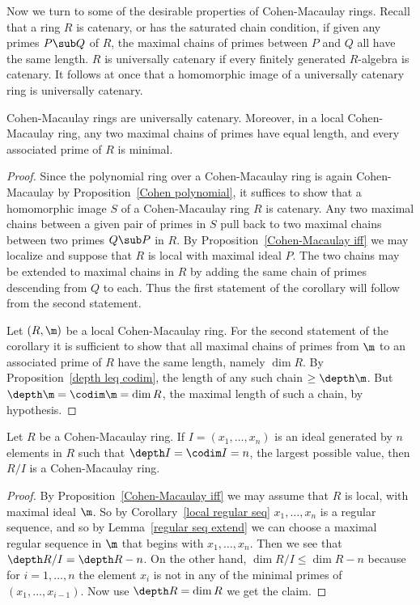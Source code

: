 Now we turn to some of the desirable properties of Cohen-Macaulay rings. Recall that a ring $R$ is catenary, or has the saturated chain condition, if given any primes $P\sub Q$ of $R$, the maximal chains of primes between $P$ and $Q$ all have the same length. $R$ is universally catenary if every finitely generated $R$-algebra is catenary. It follows at once that a homomorphic image of a universally catenary ring is universally catenary.
\begin{corollary}\label{Cohen catenary}
Cohen-Macaulay rings are universally catenary. Moreover, in a local Cohen-Macaulay ring, any two maximal chains of primes have equal length, and every associated prime of $R$ is minimal.
\end{corollary}
\begin{proof}
Since the polynomial ring over a Cohen-Macaulay ring is again Cohen-Macaulay by Proposition~\ref{Cohen polynomial}, it suffices to show that a homomorphic image $S$ of a Cohen-Macaulay ring $R$ is catenary. Any two maximal chains between a given pair of primes in $S$ pull back to two maximal chains between two primes $Q\sub P$ in $R$. By Proposition~\ref{Cohen-Macaulay iff} we may localize and suppose that $R$ is local with maximal ideal $P$. The two chains may be extended to maximal chains in $R$ by adding the same chain of primes descending from $Q$ to each. Thus the first statement of the corollary will follow from the second statement.\par
Let $(R,\m)$ be a local Cohen-Macaulay ring. For the second statement of
the corollary it is sufficient to show that all maximal chains of primes from $\m$ to an associated prime of $R$ have the same length, namely $\dim R$. By Proposition~\ref{depth leq codim}, the length of any such chain $\geq\depth\m$. But $\depth\m=\codim\m=\dim R$, the maximal length of such a chain, by hypothesis.
\end{proof}
\begin{proposition}\label{Cohen depth=n}
Let $R$ be a Cohen-Macaulay ring. If $I=(x_1,\dots,x_n)$ is an ideal generated by $n$ elements in $R$ such that $\depth I=\codim I=n$, the largest possible value, then $R/I$ is a Cohen-Macaulay ring.
\end{proposition}
\begin{proof}
By Proposition~\ref{Cohen-Macaulay iff} we may assume that $R$ is local, with maximal ideal $\m$. So by Corollary~\ref{local regular seq} $x_1,\dots,x_n$ is a regular sequence, and so by Lemma~\ref{regular seq extend} we can choose a maximal regular sequence in $\m$ that begins with $x_1,\dots,x_n$. Then we see that $\depth R/I=\depth R-n$. On the other hand, $\dim R/I\leq\dim R-n$ because for $i=1,\dots,n$ the element $x_i$ is not in any of the minimal primes of $(x_1,\dots,x_{i-1})$. Now use $\depth R=\dim R$ we get the claim.
\end{proof}
